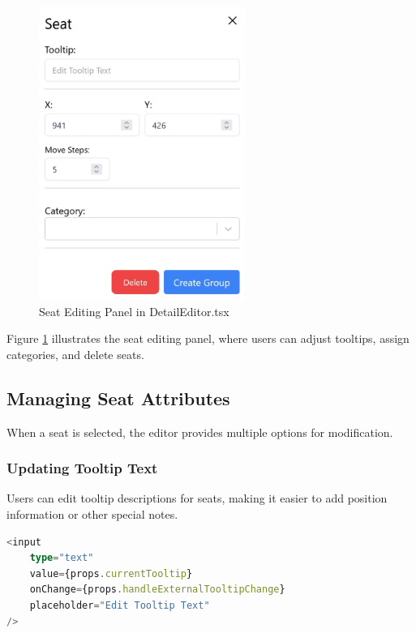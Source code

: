 \begin{figure}[H]
    \centering
    \includegraphics[width=0.6\textwidth]{pics/DetailEditorSeat.png}
    \caption{Seat Editing Panel in DetailEditor.tsx}
    \label{fig:detail-editor-seat}
\end{figure}

Figure \ref{fig:detail-editor-seat} illustrates the seat editing panel, where users can adjust tooltips, assign categories, and delete seats.

\subsection{Managing Seat Attributes}
When a seat is selected, the editor provides multiple options for modification.

\subsubsection{Updating Tooltip Text}
Users can edit tooltip descriptions for seats, making it easier to add position information or other special notes.

\begin{lstlisting}[language=TypeScript, caption=Updating Tooltip for Selected Seats, label=lst:update-tooltip]
<input
    type="text"
    value={props.currentTooltip}
    onChange={props.handleExternalTooltipChange}
    placeholder="Edit Tooltip Text"
/>
\end{lstlisting}

